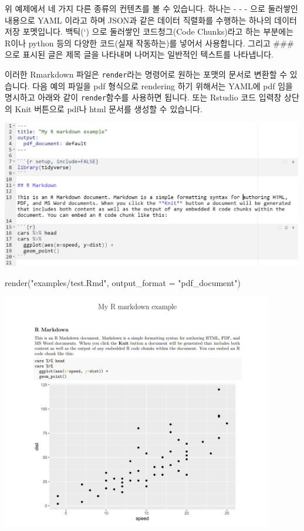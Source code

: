 \documentclass[
]{book}
\newenvironment{Shaded}{\begin{snugshade}}{\end{snugshade}}
\newcommand{\AttributeTok}[1]{\textcolor[rgb]{0.77,0.63,0.00}{#1}}
\newcommand{\FunctionTok}[1]{\textcolor[rgb]{0.00,0.00,0.00}{#1}}
\newcommand{\NormalTok}[1]{#1}
\newcommand{\StringTok}[1]{\textcolor[rgb]{0.31,0.60,0.02}{#1}}
\begin{document}
위 예제에서 네 가지 다른 종류의 컨텐츠를 볼 수 있습니다. 하나는 - - - 으로 둘러쌓인 내용으로 YAML 이라고 하며 JSON과 같은 데이터 직렬화를 수행하는 하나의 데이터 저장 포멧입니다. 백틱(`) 으로 둘러쌓인 코드청그(Code Chunks)라고 하는 부분에는 R이나 python 등의 다양한 코드(실재 작동하는)를 넣어서 사용합니다. 그리고 \#\#\# 으로 표시된 글은 제목 글을 나타내며 나머지는 일반적인 텍스트를 나타냅니다.

이러한 Rmarkdown 파일은 \texttt{render}라는 명령어로 원하는 포맷의 문서로 변환할 수 있습니다. 다음 예의 파일을 pdf 형식으로 rendering 하기 위해서는 YAML에 pdf 임을 명시하고 아래와 같이 \texttt{render}함수를 사용하면 됩니다. 또는 Rstudio 코드 입력창 상단의 Knit 버튼으로 pdf나 html 문서를 생성할 수 있습니다.

\includegraphics[width=5.20833in,height=\textheight]{images/rmarkdown/example2.PNG}

\begin{Shaded}
\begin{Highlighting}[]
\FunctionTok{render}\NormalTok{(}\StringTok{"examples/test.Rmd"}\NormalTok{, }\AttributeTok{output\_format =} \StringTok{"pdf\_document"}\NormalTok{)}
\end{Highlighting}
\end{Shaded}

\includegraphics[width=4.6875in,height=\textheight]{images/rmarkdown/ex_pdf.PNG}
\end{document}
